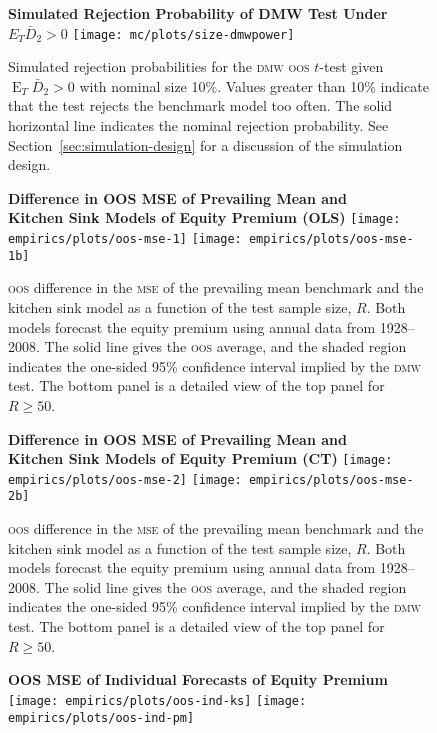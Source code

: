 \documentclass[11pt]{article}
\DeclareMathOperator{\E}{E}
\begin{document}
\begin{figure}
  \centering
  \textbf{\large{Simulated Rejection Probability of DMW Test Under $E_T
      \bar{D}_2 > 0$}}
  \texttt{[image: mc/plots/size-dmwpower]}
  \caption{Simulated rejection probabilities for the \protect \textsc{dmw}
    \protect\textsc{oos} $t$-test given $\E_T \bar{D}_2 > 0$ with nominal
    size 10\%.  Values greater than 10\% indicate that the test
    rejects the benchmark model too often.  The solid horizontal line
    indicates the nominal rejection probability.  See
    Section~\ref{sec:simulation-design} for a discussion of the
    simulation design.}
  \label{fig:ttest-power}
\end{figure}

\begin{figure}
\centering
\textbf{\large{Difference in OOS MSE of Prevailing Mean and\\ Kitchen
    Sink Models of Equity Premium (OLS)}}
\texttt{[image: empirics/plots/oos-mse-1]}
\texttt{[image: empirics/plots/oos-mse-1b]}
\caption{\protect \textsc{oos} difference in the \protect\textsc{mse}
  of the prevailing mean benchmark and the kitchen sink model as a
  function of the test sample size, $R$.  Both models forecast the
  equity premium using annual data from 1928--2008.  The solid line
  gives the \protect \textsc{oos} average, and the shaded region indicates the
  one-sided 95\% confidence interval implied by the \protect
  \textsc{dmw} test.  The bottom panel is a detailed view of the top
  panel for $R \geq 50$.}
\label{fig:empirics1}
\end{figure}

\begin{figure}
\centering
\textbf{\large{Difference in OOS MSE of Prevailing Mean and\\ Kitchen
    Sink Models of Equity Premium (CT)}}
\texttt{[image: empirics/plots/oos-mse-2]}
\texttt{[image: empirics/plots/oos-mse-2b]}
\caption{\protect \textsc{oos} difference in the \protect\textsc{mse}
  of the prevailing mean benchmark and the kitchen sink model as a
  function of the test sample size, $R$.  Both models forecast the
  equity premium using annual data from 1928--2008.  The solid line
  gives the \protect \textsc{oos} average, and the shaded region indicates the
  one-sided 95\% confidence interval implied by the \protect
  \textsc{dmw} test.  The bottom panel is a detailed view of the top
  panel for $R \geq 50$.}
\label{fig:empirics2}
\end{figure}

\begin{figure}
\centering
\textbf{\large{OOS MSE of Individual Forecasts of Equity Premium}}
\texttt{[image: empirics/plots/oos-ind-ks]}
\texttt{[image: empirics/plots/oos-ind-pm]}
\caption{}
\label{fig:empirics3}
\end{figure}
\end{document}
